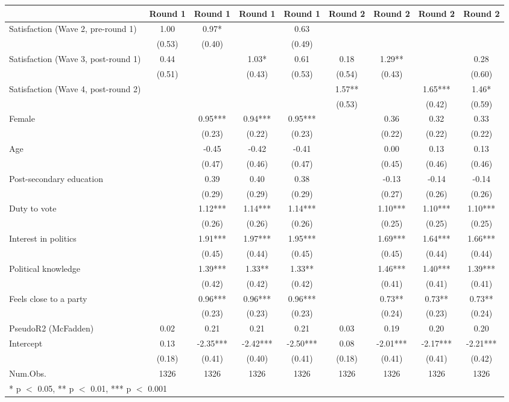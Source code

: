 \begin{table}
\centering
\begin{tabular}[t]{lcccccccc}
\toprule
  & Round 1 & Round 1  & Round 1   & Round 1    & Round 2 & Round 2  & Round 2   & Round 2   \\
\midrule
Satisfaction (Wave 2, pre-round 1) & 1.00 & 0.97* &  & 0.63 &  &  &  & \\
 & (0.53) & (0.40) &  & (0.49) &  &  &  & \\
Satisfaction (Wave 3, post-round 1) & 0.44 &  & 1.03* & 0.61 & 0.18 & 1.29** &  & 0.28\\
 & (0.51) &  & (0.43) & (0.53) & (0.54) & (0.43) &  & (0.60)\\
Satisfaction (Wave 4, post-round 2) &  &  &  &  & 1.57** &  & 1.65*** & 1.46*\\
 &  &  &  &  & (0.53) &  & (0.42) & (0.59)\\
Female &  & 0.95*** & 0.94*** & 0.95*** &  & 0.36 & 0.32 & 0.33\\
 &  & (0.23) & (0.22) & (0.23) &  & (0.22) & (0.22) & (0.22)\\
Age &  & -0.45 & -0.42 & -0.41 &  & 0.00 & 0.13 & 0.13\\
 &  & (0.47) & (0.46) & (0.47) &  & (0.45) & (0.46) & (0.46)\\
Post-secondary education &  & 0.39 & 0.40 & 0.38 &  & -0.13 & -0.14 & -0.14\\
 &  & (0.29) & (0.29) & (0.29) &  & (0.27) & (0.26) & (0.26)\\
Duty to vote &  & 1.12*** & 1.14*** & 1.14*** &  & 1.10*** & 1.10*** & 1.10***\\
 &  & (0.26) & (0.26) & (0.26) &  & (0.25) & (0.25) & (0.25)\\
Interest in politics &  & 1.91*** & 1.97*** & 1.95*** &  & 1.69*** & 1.64*** & 1.66***\\
 &  & (0.45) & (0.44) & (0.45) &  & (0.45) & (0.44) & (0.44)\\
Political knowledge &  & 1.39*** & 1.33** & 1.33** &  & 1.46*** & 1.40*** & 1.39***\\
 &  & (0.42) & (0.42) & (0.42) &  & (0.41) & (0.41) & (0.41)\\
Feels close to a party &  & 0.96*** & 0.96*** & 0.96*** &  & 0.73** & 0.73** & 0.73**\\
 &  & (0.23) & (0.23) & (0.23) &  & (0.24) & (0.23) & (0.24)\\
PseudoR2 (McFadden) & 0.02 & 0.21 & 0.21 & 0.21 & 0.03 & 0.19 & 0.20 & 0.20\\
Intercept & 0.13 & -2.35*** & -2.42*** & -2.50*** & 0.08 & -2.01*** & -2.17*** & -2.21***\\
 & (0.18) & (0.41) & (0.40) & (0.41) & (0.18) & (0.41) & (0.41) & (0.42)\\
\midrule
Num.Obs. & 1326 & 1326 & 1326 & 1326 & 1326 & 1326 & 1326 & 1326\\
\bottomrule
\multicolumn{9}{l}{\rule{0pt}{1em}* p $<$ 0.05, ** p $<$ 0.01, *** p $<$ 0.001}\\
\end{tabular}
\end{table}
